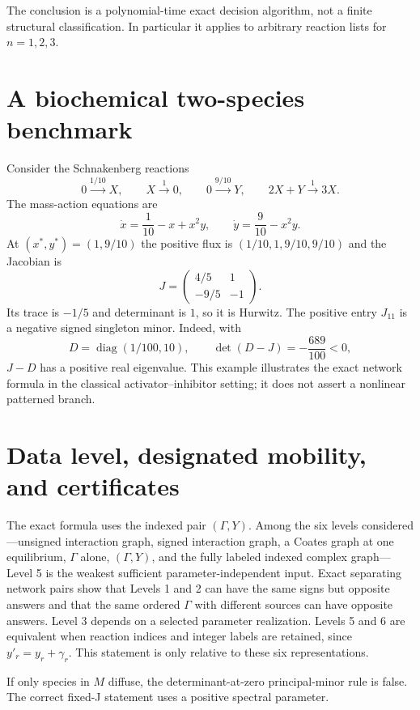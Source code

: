 \documentclass[11pt]{article}
\theoremstyle{definition}
\newcommand{\diag}{\operatorname{diag}}
\begin{document}
The conclusion is a polynomial-time exact decision algorithm, not a finite
structural classification.  In particular it applies to arbitrary reaction
lists for $n=1,2,3$.

\section{A biochemical two-species benchmark}
\label{sec:example}

Consider the Schnakenberg reactions
\[
 0\xrightarrow{1/10}X,
 \qquad X\xrightarrow{1}0,
 \qquad 0\xrightarrow{9/10}Y,
 \qquad 2X+Y\xrightarrow{1}3X.
\]
The mass-action equations are
\[
 \dot x=\frac1{10}-x+x^2y,
 \qquad
 \dot y=\frac9{10}-x^2y.
\]
At $(x^*,y^*)=(1,9/10)$ the positive flux is
$(1/10,1,9/10,9/10)$ and the Jacobian is
\[
 J=\begin{pmatrix}4/5&1\\-9/5&-1\end{pmatrix}.
\]
Its trace is $-1/5$ and determinant is $1$, so it is Hurwitz.  The positive
entry $J_{11}$ is a negative signed singleton minor.  Indeed, with
\[
 D=\diag(1/100,10),
 \qquad
 \det(D-J)=-\frac{689}{100}<0,
\]
$J-D$ has a positive real eigenvalue.  This example illustrates the exact
network formula in the classical activator--inhibitor setting; it does not
assert a nonlinear patterned branch.

\section{Data level, designated mobility, and certificates}
\label{sec:extensions}

The exact formula uses the indexed pair $(\Gamma,Y)$.  Among the six levels
considered---unsigned interaction graph, signed interaction graph, a Coates
graph at one equilibrium, $\Gamma$ alone, $(\Gamma,Y)$, and the fully labeled
indexed complex graph---Level 5 is the weakest sufficient parameter-independent
input.  Exact separating network pairs show that Levels 1 and 2 can have the
same signs but opposite answers and that the same ordered $\Gamma$ with
different sources can have opposite answers.  Level 3 depends on a selected
parameter realization.  Levels 5 and 6 are equivalent when reaction indices
and integer labels are retained, since $y'_r=y_r+\gamma_r$.  This statement is
only relative to these six representations.

If only species in $M$ diffuse, the determinant-at-zero principal-minor rule is
false.  The correct fixed-J statement uses a positive spectral parameter.
\end{document}
